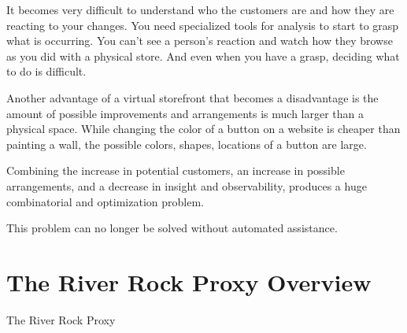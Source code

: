 \documentclass[11pt]{article}
\begin{document}
It becomes very difficult to understand who the customers are and how they are reacting
to your changes. You need specialized tools for analysis to start to grasp
what is occurring. You can't see a person's reaction and watch how they browse as you did with
a physical store. And even when you have a grasp, deciding what to do is difficult.

Another advantage of a virtual storefront that becomes a disadvantage 
is the amount of possible improvements and arrangements is much larger than
a physical space. While changing the color of a button on a website is cheaper
than painting a wall, the possible colors, shapes, locations of a button are large.

Combining the increase in potential customers, an increase in possible arrangements, and a
decrease in insight and observability, produces a huge combinatorial and optimization problem.

This problem can no longer be solved without automated assistance.

\section{The River Rock Proxy Overview}

The River Rock Proxy 
\end{document}
